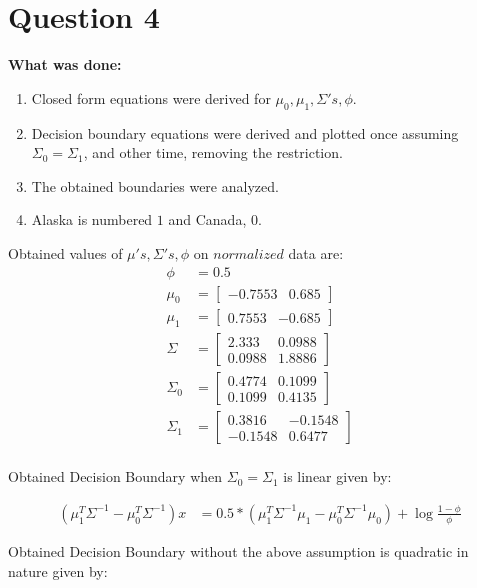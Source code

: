 \documentclass{article}
\newcommand{\bld}[1]{\textbf{#1}}
\begin{document}
\section*{Question 4}
\bld{What was done:}
\begin{enumerate}
\item Closed form equations were derived for $\mu_0,\mu_1,\Sigma's,\phi$.
\item Decision boundary equations were derived and plotted once assuming $\Sigma_0=\Sigma_1$, and other time, removing the restriction.
\item The obtained boundaries were analyzed.
\item Alaska is numbered $1$ and Canada, $0$.
\end{enumerate}  

Obtained values of $\mu's,\Sigma's,\phi$ on $normalized$ data are:
\begin{align*}
\phi &=0.5\\
\mu_0&=\begin{bmatrix}
-0.7553 & 0.685
\end{bmatrix}\\
\mu_1&=\begin{bmatrix}
0.7553 & -0.685
\end{bmatrix}\\
\Sigma&=\begin{bmatrix}
2.333 & 0.0988\\
0.0988 & 1.8886
\end{bmatrix}\\
\Sigma_0&=\begin{bmatrix}
0.4774 & 0.1099\\
0.1099 & 0.4135
\end{bmatrix}\\
\Sigma_1&=\begin{bmatrix}
0.3816 & -0.1548\\
-0.1548 & 0.6477
\end{bmatrix}\\
\end{align*}

Obtained Decision Boundary when $\Sigma_0=\Sigma_1$ is linear given by:

\begin{align*}
(\mu_1^T\Sigma^{-1}-\mu_0^T\Sigma^{-1})x&=0.5*(\mu_1^T\Sigma^{-1}\mu_1-\mu_0^T\Sigma^{-1}\mu_0) + \log{\frac{1-\phi}{\phi}}
\end{align*}

Obtained Decision Boundary without the above assumption is quadratic in nature given by:
\end{document}

